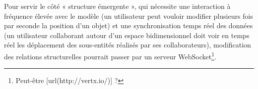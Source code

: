 Pour servir le côté « structure émergente », qui nécessite une interaction à fréquence élevée avec le modèle (un utilisateur peut vouloir modifier plusieurs fois par seconde la position d'un objet) et une synchronisation temps réel des données (un utilisateur collaborant autour d'un espace bidimensionnel doit voir en temps réel les déplacement des sous-entités réalisés par ses collaborateurs), modification des relations structurelles pourrait passer par un serveur WebSocket\footnote{Peut-être [url(http://vertx.io/)] ?}.